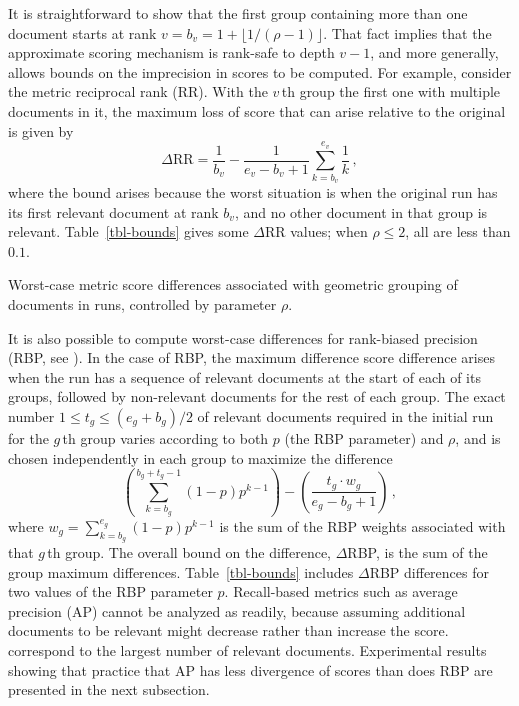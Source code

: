 
It is straightforward to show that the first group containing more
than one document starts at rank $v=b_v=1+\lfloor{1/(\rho-1)}\rfloor$.
That fact implies that the approximate scoring mechanism is rank-safe
to depth $v-1$, and more generally, allows bounds on the imprecision
in scores to be computed.
For example, consider the metric reciprocal rank (RR).
With the $v$\,th group the first one with multiple documents in it,
the maximum loss of score that can arise relative to the original is
given by
\[
	\Delta\mbox{RR} = \frac{1}{b_v} -
		\frac{1}{e_v-b_v+1}\sum_{k=b_v}^{e_v} \frac{1}{k} \,,
\]
where the bound arises because the worst situation is when the
original run has its first relevant document at rank $b_v$, and no
other document in that group is relevant.
Table~\ref{tbl-bounds} gives some $\Delta$RR values; when $\rho\le2$,
all are less than $0.1$.


\begin{table}[t]
\centering

\caption{Worst-case metric score differences associated with geometric
grouping of documents in runs, controlled by parameter $\rho$.
\label{tbl-bounds}}
\end{table}

It is also possible to compute worst-case differences for rank-biased
precision (RBP, see {\citet{mz08acmtois}}).
In the case of RBP, the maximum difference score difference arises
when the run has a sequence of relevant documents at the start of
each of its groups, followed by non-relevant documents for the rest
of each group.
The exact number $1\le t_g \le (e_g+b_g)/2$ of relevant documents
required in the initial run for the $g$\,th group varies according to
both $p$ (the RBP parameter) and $\rho$, and is chosen independently
in each group to maximize the difference
\[
	\left(
	\sum_{k=b_g}^{b_g+t_g-1} (1-p)p^{k-1}
	\right)
	-
	\left(
	\frac{t_g\cdot w_g}{e_g-b_g+1}
	\right) \, ,
\]
where $w_g=\sum_{k=b_g}^{e_g} (1-p)p^{k-1}$ is the sum of the RBP
weights associated with that $g$\,th group.
The overall bound on the difference, $\Delta$RBP, is the sum of the
group maximum differences.
Table~\ref{tbl-bounds} includes $\Delta$RBP differences for two
values of the RBP parameter $p$.
Recall-based metrics such as average precision (AP) cannot be
analyzed as readily, because assuming additional documents to be
relevant might decrease rather than increase the score.
correspond to the largest number of relevant documents.
Experimental results showing that practice that AP has less
divergence of scores than does RBP are presented in the next
subsection.


